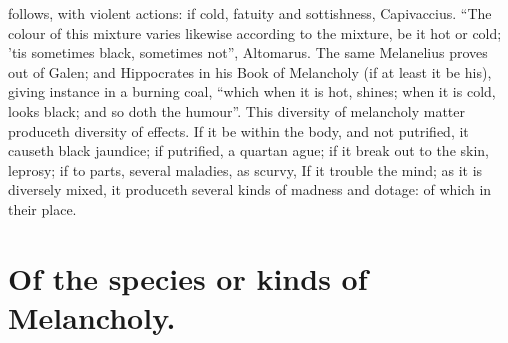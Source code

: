 follows, with violent actions: if cold, fatuity and sottishness,
Capivaccius. \enquote{The colour of this
mixture varies likewise according to the mixture, be it hot or cold; 'tis
sometimes black, sometimes not}, Altomarus. The same
Melanelius proves out of Galen; and Hippocrates in his
Book of Melancholy (if at least it be his), giving instance in a burning coal,
\enquote{which when it is hot, shines; when it is cold, looks black; and so doth the
humour}. This diversity of melancholy matter produceth diversity of effects. If
it be within the body, and not putrified, it causeth black
jaundice; if putrified, a quartan ague; if it break out to the skin, leprosy;
if to parts, several maladies, as scurvy, \etc{} If it trouble the mind; as it
is diversely mixed, it produceth several kinds of madness and dotage: of which
in their place.

\section{Of the species or kinds of Melancholy.}

